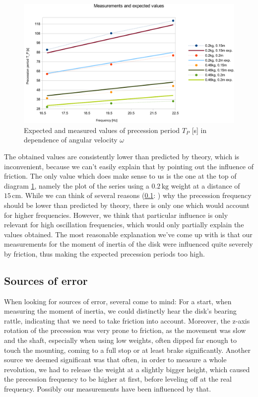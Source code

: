 \documentclass{scrreprt}
\newcommand{\unit}[1]{\ensuremath{\, \mathrm{#1}}}
\begin{document}
\begin{figure}[H]
	\centering
  \includegraphics[width=1.0\textwidth]{diag/meas_exp_crop.pdf}
	\caption{Expected and measured values of precession period $T_P$ [s] in dependence of angular velocity $\omega$}
	\label{diag:meas_exp}
\end{figure}

The obtained values are consistently lower than predicted by theory, which is inconvenient, because we can't easily explain that by pointing out the influence of friction. The only value which does make sense to us is the one at the top of diagram \ref{diag:meas_exp}, namely the plot of the series using a $0.2 \unit{kg}$ weight at a distance of $15 \unit{cm}$. While we can think of several reasons (\ref{sec:error}: ) why the precession frequency should be lower than predicted by theory, there is only one which would account for higher frequencies. However,  we think that particular influence is only relevant for high oscillation frequencies, which would only partially explain the values obtained. The most reasonable explanation we've come up with is that our measurements for the moment of inertia of the disk were influenced quite severely by friction, thus making the expected precession periods too high.

\subsection{Sources of error}
\label{sec:error}
When looking for sources of error, several come to mind: For a start, when measuring the moment of inertia, we could distinctly hear the disk's bearing rattle, indicating that we need to take friction into account. Moreover, the z-axis rotation of the precession was very prone to friction, as the movement was slow and the shaft, especially when using low weights, often dipped far enough to touch the mounting, coming to a full stop or at least brake significantly. Another source we deemed significant was that often, in order to measure a whole revolution, we had to release the weight at a slightly bigger height, which caused the precession frequency to be higher at first, before leveling off at the real frequency. Possibly our measurements have been influenced by that.
\end{document}
